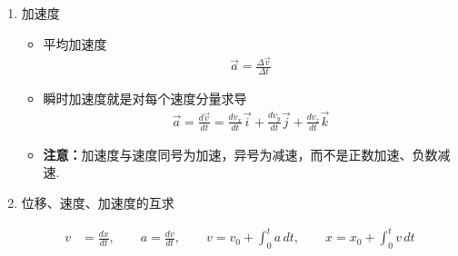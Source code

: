\begin{enumerate}
\begin{itemize}
		\item 瞬时速度就是对每个坐标分量求导：
		\begin{align*}
			\vec{v}
			=\frac{d\vec{r}}{dt}
			=\frac{dx}{dt}\vec{i}
			+\frac{dy}{dt}\vec{j}
			+\frac{dz}{dt}\vec{k}.
		\end{align*}
		
		\item 瞬时速率是瞬时速度的大小：
		\begin{align*}
			v
			=\left|\frac{d\vec{r}}{dt}\right|
			=\frac{ds}{dt}
			=\sqrt{
				\left(\frac{dx}{dt}\right)^2
				+\left(\frac{dy}{dt}\right)^2
				+\left(\frac{dz}{dt}\right)^2
			}.
		\end{align*}
		
		\item \textbf{注意：}不能写成
		\begin{align*}
			\frac{dr}{dt}
			\quad \text{或} \quad
			\frac{d|\vec{r}|}{dt}.
		\end{align*}
	\end{itemize}

	\item 加速度
	
	\begin{itemize}
		\item 平均加速度
		\begin{align*}
			\vec{a} = \frac{\Delta \vec{v}}{\Delta t}
		\end{align*}
		
		\item 瞬时加速度就是对每个速度分量求导
		\begin{align*}
			\vec{a}
			= \frac{d\vec{v}}{dt}
			= \frac{dv_x}{dt}\vec{i}
			+ \frac{dv_y}{dt}\vec{j}
			+ \frac{dv_z}{dt}\vec{k}
		\end{align*}
		
		\item \textbf{注意：}加速度与速度同号为加速，异号为减速，而不是正数加速、负数减速.
	\end{itemize}
	
	
	\item 位移、速度、加速度的互求
	
	\begin{align*}
		v &= \frac{dx}{dt}, \qquad
		a = \frac{dv}{dt}, \qquad
		v = v_0 + \int_0^t a\,dt, \qquad
		x = x_0 + \int_0^t v\,dt
	\end{align*}
	
\end{enumerate}

\newpage


